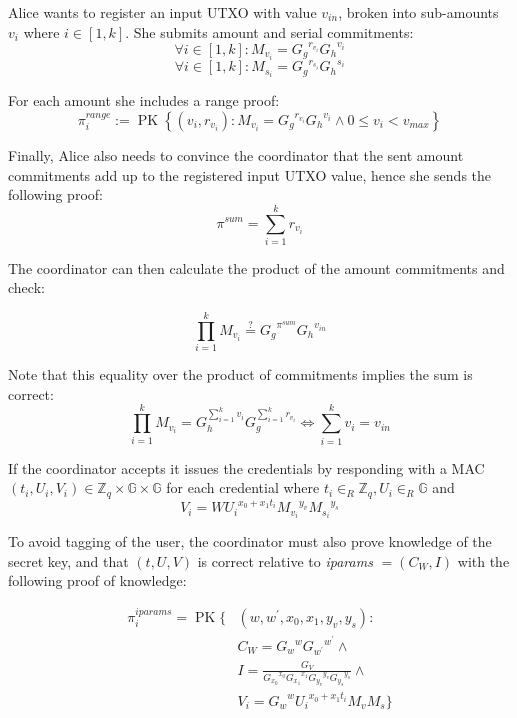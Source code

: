 \documentclass{article}
\begin{document}
Alice wants to register an input UTXO with value $v_{\mathit{in}}$, broken into sub-amounts $v_i$ where $i \in \left[1,k\right]$.
She submits amount and serial commitments:
\[ \forall i \in \left[1,k\right]: M_{v_i}={G_g}^{r_{v_i}}{G_h}^{v_i} \]
\[ \forall i \in \left[1,k\right]: M_{s_i}={G_g}^{r_{s_i}}{G_h}^{s_i} \]

For each amount she includes a range proof:
\[
\pi^{\mathit{range}}_i := \operatorname{PK}\left\{\left(v_i, r_{v_i} \right) :
M_{v_i} = {G_g}^{r_{v_i}}{G_h}^{v_i}
\wedge
0 \leq v_i < v_{\mathit{max}} \right\}
\]

Finally, Alice also needs to convince the coordinator that the sent amount commitments add up to the registered input UTXO value, hence she sends the following proof:
\[ \pi^{\mathit{sum}}=\sum_{i=1}^{k} r_{v_i} \]

The coordinator can then calculate the product of the amount commitments and check:

\[ \prod_{i=1}^{k} M_{v_i}
\stackrel{?}{=}
{G_g}^{\pi^{\mathit{sum}}}{G_h}^{v_{\mathit{in}}}
\]

Note that this equality over the product of commitments implies the sum is correct:
\[\prod_{i=1}^{k} M_{v_i}
= G_h^{\sum_{i=1}^{k} v_i} G_g^{\sum_{i=1}^{k} r_{v_i}}
\iff
\sum_{i=1}^{k} v_i = v_{\mathit{in}}
\]

If the coordinator accepts it issues the credentials by responding with a MAC
$(t_i, U_i, V_i) \in \mathbb{Z}_q \times \mathbb{G} \times \mathbb{G}$ for each credential
where
$t_i \in_{R} \mathbb{Z}_{q}, U_i \in_{R} \mathbb{G}$
and
\[
V_i=W {U_i}^{x_{0}+x_{1} t_i}{M_{v_i}}^{y_v} {M_{s_i}}^{y_s}
\]

To avoid tagging of the user, the coordinator must also prove knowledge of the secret key, and that \( (t, U, V) \) is correct relative to \textit{iparams} \( =\left(C_{W}, I\right) \) with the following proof of knowledge:

\begin{align*}
\pi_{i}^{\mathit{iparams}}=\operatorname{PK}\{ & (w, w^{\prime}, x_{0}, x_{1}, y_v, y_s): \\
&C_{W}={G_{w}}^{w} {G_{w^{\prime}}}^{w^\prime} \wedge \\
&I=\frac{G_{V}}{{G_{x_{0}}}^{x_0} {G_{x_1}}^{x_1} {G_{y_v}}^{y_v} {G_{y_s}}^{y_s}} \wedge \\
&V_i={G_w}^{w}{U_i}^{x_{0}+x_{1}t_i} M_v M_s
\}
\end{align*}
\end{document}
